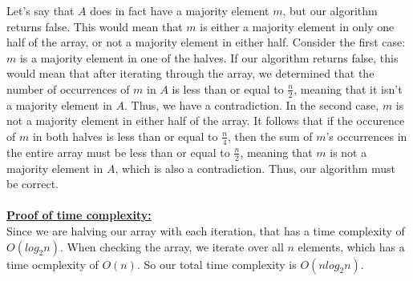 \documentclass[10pt, letterpaper]{report}
\begin{document}
Let's say that $A$ does in fact have a majority element $m$, but our algorithm returns false. This would mean that $m$ is either a majority element in only one half of the array, or not a majority element in either half. Consider the first case: $m$ is a majority element in one of the halves. If our algorithm returns false, this would mean that after iterating through the array, we determined that the number of occurrences of $m$ in $A$ is less than or equal to $\frac{n}{2}$, meaning that it isn't a majority element in $A$. Thus, we have a contradiction. In the second case, $m$ is not a majority element in either half of the array. It follows that if the occurence of $m$ in both halves is less than or equal to $\frac{n}{4}$, then the sum of $m$'s occurrences in the entire array must be less than or equal to $\frac{n}{2}$, meaning that $m$ is not a majority element in $A$, which is also a contradiction. Thus, our algorithm must be correct.\\
\\
\textbf{\underline{Proof of time complexity:}}\\
Since we are halving our array with each iteration, that has a time complexity of $O(log_2n)$. When checking the array, we iterate over all $n$ elements, which has a time ocmplexity of $O(n)$. So our total time complexity is $O(nlog_{2}n)$.
\end{document}
